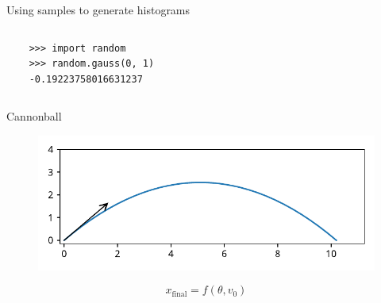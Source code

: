 \documentclass[12pt, aspectratio=149]{beamer}
\theoremstyle{plain}
\begin{document}
\begin{frame}[fragile]{Using samples to generate histograms}
\begin{columns}
\begin{column}{0.5\textwidth}
\begin{center}
\begin{figure}
		 \end{figure}
		  \begin{verbatim}
	>>> import random
	>>> random.gauss(0, 1)
	-0.19223758016631237
		  \end{verbatim}
		 \end{center}
	\end{column}
	\end{columns}
\end{frame}
	

\begin{frame}[fragile]{Cannonball}
\vspace*{-1em}
\begin{center}
 \begin{figure}
    	\centering
    	\includegraphics[width=0.99\linewidth]{figures/cannonball}
 \end{figure}
 \end{center}
 \vspace*{-2em}

\begin{center}
\begin{equation*}
x_{\text{final}} = f(\theta, v_0)
\end{equation*}
\end{center}
\end{frame}
\end{document}
